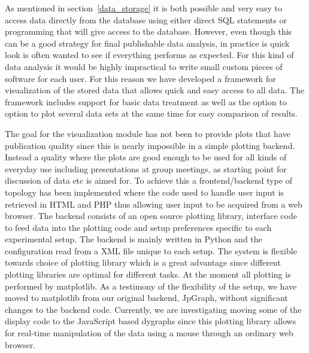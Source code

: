 As mentioned in section~\ref{data_storage} it is both possible and very easy to
access data directly from the database using either direct SQL statements or
programming that will give access to the database. However, even though this
can be a good strategy for final publishable data analysis, in practice is
quick look is often wanted to see if everything performs as expected. For this
kind of data analysis it would be highly impractical to write small custom
pieces of software for each user. For this reason we have developed a framework
for visualization of the stored data that allows quick and easy access to all
data. The framework includes support for basic data treatment as well as the
option to option to plot several data sets at the same time for easy comparison
of results.

The goal for the visualization module has not been to provide plots that have
publication quality since this is nearly impossible in a simple plotting
backend. Instead a quality where the plots are good enough to be used for all
kinds of everyday use including presentations at group meetings, as starting
point for discussion of data etc is aimed for. To achieve this a
frontend/backend type of topology has been implemented where the code used to
handle user input is retrieved in HTML and PHP thus allowing user input to be
acquired from a web browser. The backend consists of an open source plotting
library, interface code to feed data into the plotting code and setup
preferences specific to each experimental setup. The backend is mainly written
in Python\cite{python} and the configuration read from a XML file unique to
each setup. The system is flexible towards choice of plotting library which is
a great advantage since different plotting libraries are optimal for different
tasks. At the moment all plotting is performed by matplotlib\cite{matplotlib}.
As a testimony of the flexibility of the setup, we have moved to matplotlib
from our original backend, JpGraph\cite{jpgraph}, without significant changes
to the backend code. Currently, we are investigating moving some of the display
code to the JavaScript based dygraphs\cite{dygraphs} since this plotting
library allows for real-time manipulation of the data using a mouse through an
ordinary web browser.
